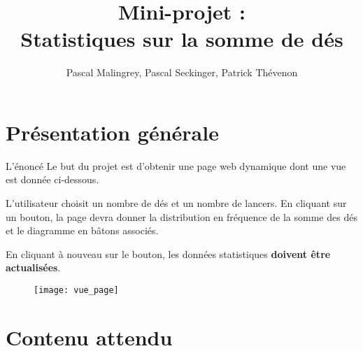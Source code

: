 \documentclass[10pt,french,A4]{article}
\title{Mini-projet :
\\
Statistiques sur la somme de dés}
\author{Pascal Malingrey, Pascal Seckinger, Patrick Thévenon}
\date{}
\theoremstyle{plain}
\begin{document}
\maketitle
\begin{center}
\end{center}


\newpage
\section{Présentation générale}

\begin{bclogo}{L'énoncé}
Le but du projet est d'obtenir une page web dynamique dont une vue est donnée ci-dessous.

L'utilisateur choisit un nombre de dés et un nombre de lancers.
En cliquant sur un bouton, la page devra donner la distribution en fréquence de la somme des dés et le diagramme en bâtons associés.

En cliquant à nouveau sur le bouton, les données statistiques \textbf{doivent être actualisées}.
\end{bclogo}

\begin{figure}[h]
    \centering
    \texttt{[image: vue\_page]}
    \caption{}
    \label{fig:vuepage}
\end{figure}

\section{Contenu attendu}
\end{document}
